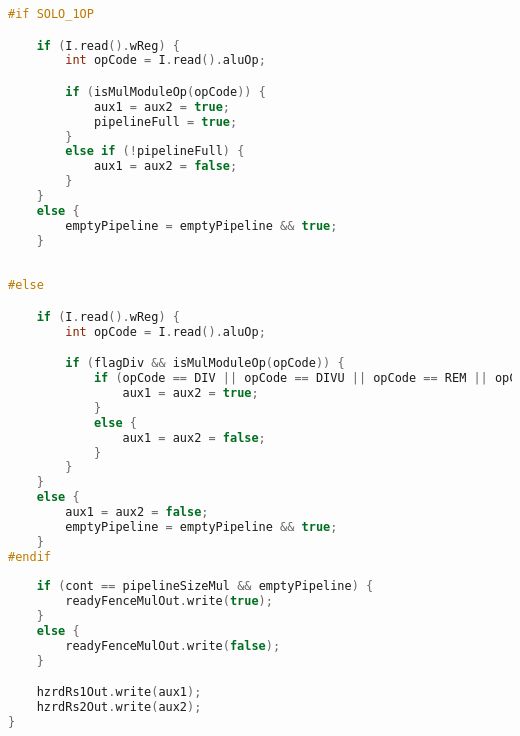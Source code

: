 \begin{lstlisting}[language=C++]
#if SOLO_1OP

	if (I.read().wReg) {
		int opCode = I.read().aluOp;

		if (isMulModuleOp(opCode)) {
			aux1 = aux2 = true;
			pipelineFull = true;
		}
		else if (!pipelineFull) {
			aux1 = aux2 = false;
		}
	}
	else {
		emptyPipeline = emptyPipeline && true;
	}
	
	
#else

	if (I.read().wReg) {
		int opCode = I.read().aluOp;

		if (flagDiv && isMulModuleOp(opCode)) {
			if (opCode == DIV || opCode == DIVU || opCode == REM || opCode == REMU) {
				aux1 = aux2 = true;
			}
			else {
				aux1 = aux2 = false;
			}
		}
	}
	else {
		aux1 = aux2 = false;
		emptyPipeline = emptyPipeline && true;
	}
#endif
	
	if (cont == pipelineSizeMul && emptyPipeline) {
		readyFenceMulOut.write(true);
	}
	else {
		readyFenceMulOut.write(false);
	}

	hzrdRs1Out.write(aux1);
	hzrdRs2Out.write(aux2);
}
\end{lstlisting}
